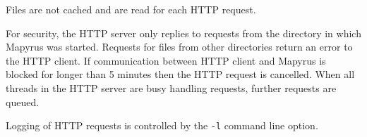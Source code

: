 Files are not cached and are read for each HTTP request.

For security, the HTTP server only replies to requests
from the directory in which Mapyrus was started.
Requests for files from other directories return an error to the HTTP client.
If communication between HTTP client and Mapyrus is blocked for longer than
5 minutes then the HTTP request is cancelled.
When all threads in the HTTP server are busy handling requests,
further requests are queued.

Logging of HTTP requests is controlled by the \texttt{-l} command line option.
